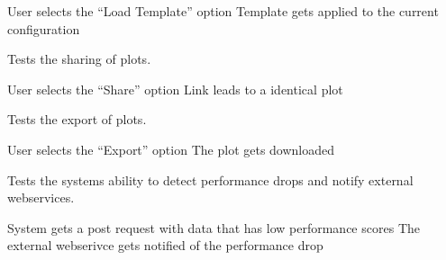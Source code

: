 {User selects the \enquote{Load Template} option}
{Template gets applied to the current configuration}


Tests the sharing of \glspl{plot}.

{User selects the \enquote{Share} option}
{Link leads to a identical \gls{plot}}


Tests the export of \glspl{plot}.

{User selects the \enquote{Export} option}
{The \gls{plot} gets downloaded}


Tests the systems ability to detect performance drops and notify external webservices.

{System gets a post request with data that has low performance scores}
{The external webserivce gets notified of the performance drop}
